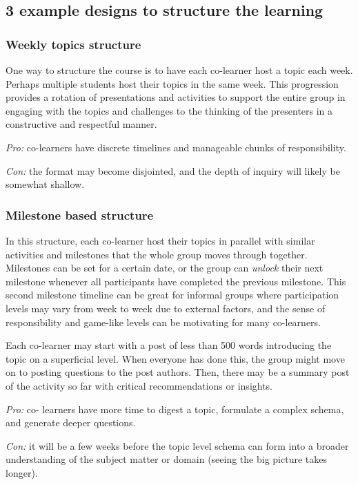 \subsection{3 example designs to structure the learning}

\subsubsection{Weekly topics structure}

One way to structure the course is to have each co-learner host a topic
each week. Perhaps multiple students host their topics in the same week.
This progression provides a rotation of presentations and activities to
support the entire group in engaging with the topics and challenges to
the thinking of the presenters in a constructive and respectful manner.

\emph{Pro:} co-learners have discrete timelines and manageable chunks of
responsibility.

\emph{Con:} the format may become disjointed, and the depth of inquiry
will likely be somewhat shallow.

\subsubsection{Milestone based structure}

In this structure, each co-learner host their topics in parallel with
similar activities and milestones that the whole group moves through
together. Milestones can be set for a certain date, or the group can
\emph{unlock} their next milestone whenever all participants have
completed the previous milestone. This second milestone timeline can be
great for informal groups where participation levels may vary from week
to week due to external factors, and the sense of responsibility and
game-like levels can be motivating for many co-learners.

Each co-learner may start with a post of less than 500 words introducing
the topic on a superficial level. When everyone has done this, the group
might move on to posting questions to the post authors. Then, there may
be a summary post of the activity so far with critical recommendations
or insights.

\emph{Pro:} co- learners have more time to digest a topic, formulate a
complex schema, and generate deeper questions.

\emph{Con:} it will be a few weeks before the topic level schema can
form into a broader understanding of the subject matter or domain
(seeing the big picture takes longer).

